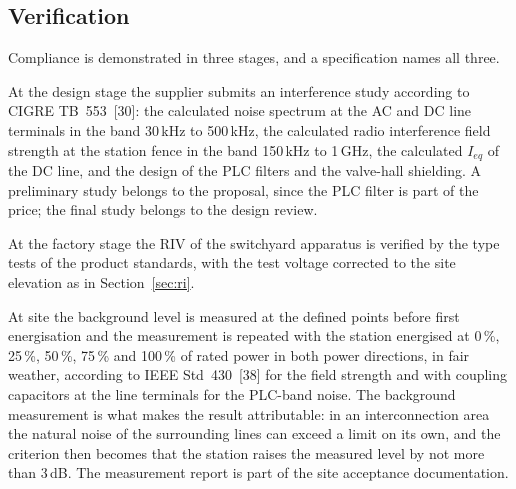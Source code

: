 \subsection{Verification}
\label{sec:interference-verification}

Compliance is demonstrated in three stages, and a specification names all
three.

At the design stage the supplier submits an interference study according to
CIGRE TB~553~[30]: the calculated noise spectrum at the AC and DC line
terminals in the band 30\,kHz to 500\,kHz, the calculated radio interference
field strength at the station fence in the band 150\,kHz to 1\,GHz, the
calculated $I_{eq}$ of the DC line, and the design of the PLC filters and the
valve-hall shielding. A preliminary study belongs to the proposal, since the
PLC filter is part of the price; the final study belongs to the design
review.

At the factory stage the RIV of the switchyard apparatus is verified by the
type tests of the product standards, with the test voltage corrected to the
site elevation as in Section~\ref{sec:ri}.

At site the background level is measured at the defined points before first
energisation and the measurement is repeated with the station energised at
0\,\%, 25\,\%, 50\,\%, 75\,\% and 100\,\% of rated power in both power
directions, in fair weather, according to IEEE Std~430~[38] for the field
strength and with coupling capacitors at the line terminals for the PLC-band
noise. The background measurement is what makes the result attributable: in
an interconnection area the natural noise of the surrounding lines can exceed
a limit on its own, and the criterion then becomes that the station raises
the measured level by not more than 3\,dB. The measurement report is part of
the site acceptance documentation.
\FloatBarrier
